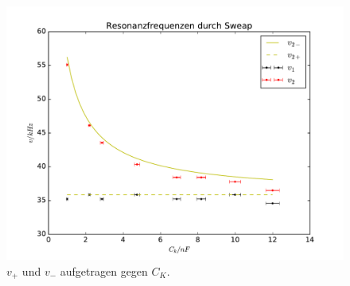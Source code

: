 \begin{figure}
  \centering
  \includegraphics[width=\textwidth]{./plots/sweap.pdf}
  \caption{$v_+$ und $v_-$ aufgetragen gegen $C_K$.}
  \label{fig:sweep}
\end{figure}
\FloatBarrier
